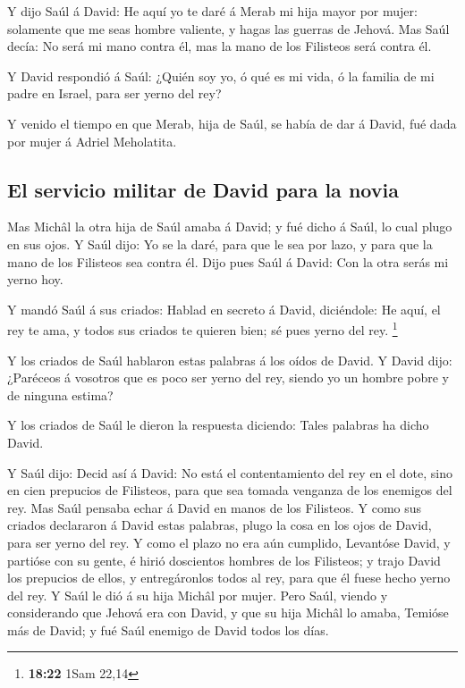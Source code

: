  Y dijo Saúl á David: He aquí yo te daré á Merab mi hija
mayor por mujer: solamente que me seas hombre valiente, y hagas las
guerras de Jehová. Mas Saúl decía: No será mi mano contra él, mas la
mano de los Filisteos será contra él.

 Y David respondió á Saúl: ¿Quién soy yo, ó qué es mi vida,
ó la familia de mi padre en Israel, para ser yerno del rey?

 Y venido el tiempo en que Merab, hija de Saúl, se había de
dar á David, fué dada por mujer á Adriel Meholatita.

\hypertarget{el-servicio-militar-de-david-para-la-novia}{%
\subsection{El servicio militar de David para la
novia}\label{el-servicio-militar-de-david-para-la-novia}}

 Mas Michâl la otra hija de Saúl amaba á David; y fué dicho
á Saúl, lo cual plugo en sus ojos.  Y Saúl dijo: Yo se la
daré, para que le sea por lazo, y para que la mano de los Filisteos sea
contra él. Dijo pues Saúl á David: Con la otra serás mi yerno hoy.

 Y mandó Saúl á sus criados: Hablad en secreto á David,
diciéndole: He aquí, el rey te ama, y todos sus criados te quieren bien;
sé pues yerno del rey. \footnote{\textbf{18:22} 1Sam 22,14}

 Y los criados de Saúl hablaron estas palabras á los oídos
de David. Y David dijo: ¿Paréceos á vosotros que es poco ser yerno del
rey, siendo yo un hombre pobre y de ninguna estima?

 Y los criados de Saúl le dieron la respuesta diciendo:
Tales palabras ha dicho David.

 Y Saúl dijo: Decid así á David: No está el contentamiento
del rey en el dote, sino en cien prepucios de Filisteos, para que sea
tomada venganza de los enemigos del rey. Mas Saúl pensaba echar á David
en manos de los Filisteos.  Y como sus criados declararon á
David estas palabras, plugo la cosa en los ojos de David, para ser yerno
del rey. Y como el plazo no era aún cumplido,  Levantóse
David, y partióse con su gente, é hirió doscientos hombres de los
Filisteos; y trajo David los prepucios de ellos, y entregáronlos todos
al rey, para que él fuese hecho yerno del rey. Y Saúl le dió á su hija
Michâl por mujer.  Pero Saúl, viendo y considerando que
Jehová era con David, y que su hija Michâl lo amaba, 
Temióse más de David; y fué Saúl enemigo de David todos los días.

